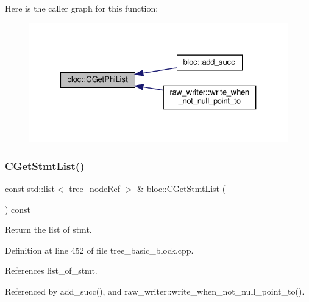 Here is the caller graph for this function\+:
\nopagebreak
\begin{figure}[H]
\begin{center}
\leavevmode
\includegraphics[width=327pt]{d6/df6/structbloc_aad212d08adb1634e15b4c0bcb31392b2_icgraph}
\end{center}
\end{figure}
\mbox{\label{structbloc_a05e3972caa7a3fbfe64eac935c376930}} 
\subsubsection{\texorpdfstring{C\+Get\+Stmt\+List()}{CGetStmtList()}}
{\footnotesize\ttfamily const std\+::list$<$ \hyperlink{tree__node_8hpp_a6ee377554d1c4871ad66a337eaa67fd5}{tree\+\_\+node\+Ref} $>$ \& bloc\+::\+C\+Get\+Stmt\+List (\begin{DoxyParamCaption}{ }\end{DoxyParamCaption}) const}



Return the list of stmt. 



Definition at line 452 of file tree\+\_\+basic\+\_\+block.\+cpp.



References list\+\_\+of\+\_\+stmt.



Referenced by add\+\_\+succ(), and raw\+\_\+writer\+::write\+\_\+when\+\_\+not\+\_\+null\+\_\+point\+\_\+to().


